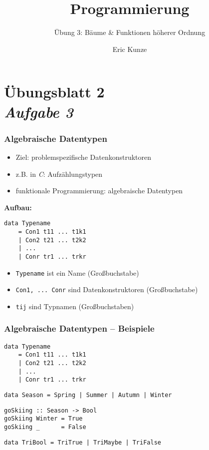 \documentclass{beamer}
\begin{document}
	
	\title{Programmierung}
	\subtitle{Übung 3: Bäume \& Funktionen höherer Ordnung}
	\author{Eric Kunze}
	\date{}
	
	\maketitle
	



\section{Übungsblatt 2 \\ \textit{\normalsize Aufgabe 3}}

\begin{frame}[fragile] \frametitle{Algebraische Datentypen}
	\begin{itemize}
		\item Ziel: problemspezifische Datenkonstruktoren
		\item z.B. in \textit{C}: Aufzählungstypen
		\item funktionale Programmierung: algebraische Datentypen
	\end{itemize}
	
	\textbf{Aufbau:}
	\begin{lstlisting}
data Typename 
	= Con1 t11 ... t1k1
	| Con2 t21 ... t2k2
	| ...
	| Conr tr1 ... trkr
	\end{lstlisting}
	\begin{itemize}
		\item \texttt{Typename} ist ein Name (Großbuchstabe)
		\item \texttt{Con1, ... Conr} sind Datenkonstruktoren (Großbuchstabe)
		\item \texttt{tij} sind Typnamen (Großbuchstaben)
	\end{itemize}
\end{frame}

\begin{frame}[fragile] \frametitle{Algebraische Datentypen -- Beispiele}
	
	\begin{lstlisting}
data Typename 
	= Con1 t11 ... t1k1
	| Con2 t21 ... t2k2
	| ...
	| Conr tr1 ... trkr
	\end{lstlisting}
	
	\begin{lstlisting}
data Season = Spring | Summer | Autumn | Winter
	\end{lstlisting}
	
	\begin{lstlisting}
goSkiing :: Season -> Bool
goSkiing Winter = True
goSkiing _      = False
	\end{lstlisting}
	
	\begin{lstlisting}
data TriBool = TriTrue | TriMaybe | TriFalse
	\end{lstlisting}
\end{frame}
\end{document}
